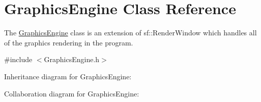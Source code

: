 \hypertarget{class_graphics_engine}{}\section{Graphics\+Engine Class Reference}
\label{class_graphics_engine}


The \hyperlink{class_graphics_engine}{Graphics\+Engine} class is an extension of sf\+::\+Render\+Window which handles all of the graphics rendering in the program.  




{\ttfamily \#include $<$Graphics\+Engine.\+h$>$}



Inheritance diagram for Graphics\+Engine\+:


Collaboration diagram for Graphics\+Engine\+:
